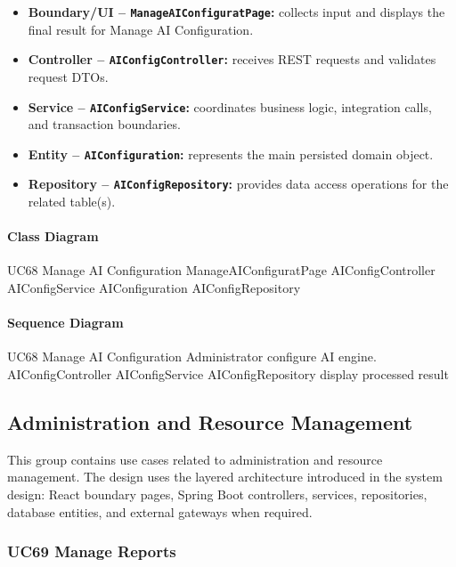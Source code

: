 \begin{itemize}
    \item \textbf{Boundary/UI -- \texttt{ManageAIConfiguratPage}:} collects input and displays the final result for Manage AI Configuration.
    \item \textbf{Controller -- \texttt{AIConfigController}:} receives REST requests and validates request DTOs.
    \item \textbf{Service -- \texttt{AIConfigService}:} coordinates business logic, integration calls, and transaction boundaries.
    \item \textbf{Entity -- \texttt{AIConfiguration}:} represents the main persisted domain object.
    \item \textbf{Repository -- \texttt{AIConfigRepository}:} provides data access operations for the related table(s).
\end{itemize}

\paragraph{Class Diagram}

\ClassDiagram
{UC68 Manage AI Configuration}
{ManageAIConfiguratPage}
{AIConfigController}
{AIConfigService}
{AIConfiguration}
{AIConfigRepository}

\paragraph{Sequence Diagram}

\SequenceDiagram
{UC68 Manage AI Configuration}
{Administrator}
{configure AI engine.}
{AIConfigController}
{AIConfigService}
{AIConfigRepository}
{display processed result}

\subsection{Administration and Resource Management}

This group contains use cases related to administration and resource management. The design uses the layered architecture introduced in the system design: React boundary pages, Spring Boot controllers, services, repositories, database entities, and external gateways when required.

\subsubsection{UC69 Manage Reports}

